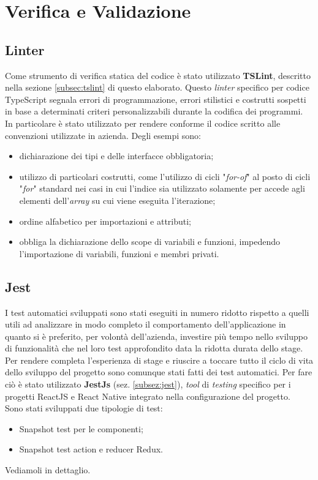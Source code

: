 
\chapter{Verifica e Validazione}\label{chap:tests}
\section{Linter}
Come strumento di verifica statica del codice è stato utilizzato \textbf{TSLint}, descritto nella sezione \ref{subsec:tslint} di questo elaborato. Questo \emph{linter} specifico per codice TypeScript segnala errori di programmazione, errori stilistici e costrutti sospetti in base a determinati criteri personalizzabili durante la codifica dei programmi.\\
In particolare è stato utilizzato per rendere conforme il codice scritto alle convenzioni utilizzate in azienda. Degli esempi sono:
\begin{itemize}
	\item dichiarazione dei tipi e delle interfacce obbligatoria;
	\item utilizzo di particolari costrutti, come l'utilizzo di cicli "\emph{for-of}" al posto di cicli "\emph{for}" standard nei casi in cui l'indice sia utilizzato solamente per accede agli elementi dell'\emph{array} su cui viene eseguita l'iterazione;
	\item ordine alfabetico per importazioni e attributi; 
	\item obbliga la dichiarazione dello scope di variabili e funzioni, impedendo l'importazione di variabili, funzioni e membri privati.
\end{itemize}
\section{Jest}
I test automatici sviluppati sono stati eseguiti in numero ridotto rispetto a quelli utili ad analizzare in modo completo il comportamento dell'applicazione in quanto si è preferito, per volontà dell'azienda, investire più tempo nello sviluppo di funzionalità che nel loro test approfondito data la ridotta durata dello stage. \\
Per rendere completa l'esperienza di stage e riuscire a toccare tutto il ciclo di vita dello sviluppo del progetto sono comunque stati fatti dei test automatici. Per fare ciò è stato utilizzato \textbf{JestJs} (sez. \ref{subsez:jest}), \emph{tool} di \emph{testing} specifico per i progetti ReactJS e React Native integrato nella configurazione del progetto. \\
Sono stati sviluppati due tipologie di test:
\begin{itemize}
	\item Snapshot test per le componenti;
	\item Snapshot test action e reducer Redux.
\end{itemize}
Vediamoli in dettaglio.
